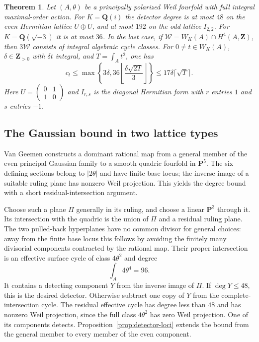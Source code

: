 \documentclass[11pt]{article}
\newtheorem{theorem}{Theorem}[section]
\theoremstyle{definition}
\theoremstyle{remark}
\newcommand{\Q}{\mathbf Q}
\newcommand{\Z}{\mathbf Z}
\begin{document}
\begin{theorem}\label{thm:small-detectors}
Let $(A,\theta)$ be a principally polarized Weil fourfold with full integral maximal-order action. For $K=\Q(i)$ the detector degree is at most $48$ on the even Hermitian lattice $U\oplus U$, and at most $192$ on the odd lattice $I_{2,2}$. For $K=\Q(\sqrt{-3})$ it is at most $36$. In the last case, if $\mathcal W=W_K(A)\cap H^4(A,\Z)$, then $3\mathcal W$ consists of integral algebraic cycle classes. For $0\ne t\in W_K(A)$, $\delta\in\Z_{>0}$ with $\delta t$ integral, and $T=\int_A t^2$, one has
\begin{equation}\label{eq:eisenstein-cost}
 c_t\leq\max\left\{3\delta,
 36\left\lfloor\frac{\delta\sqrt{2T}}3\right\rfloor\right\}
 \leq17\delta\lceil\sqrt T\rceil.
\end{equation}
Here $U=\left(\begin{smallmatrix}0&1\\1&0\end{smallmatrix}\right)$ and $I_{r,s}$ is the diagonal Hermitian form with $r$ entries $1$ and $s$ entries $-1$.
\end{theorem}

\subsection{The Gaussian bound in two lattice types}

Van Geemen \cite[Proposition~3.6 and Theorem~3.7, pp.~623--625]{vG96} constructs a dominant rational map from a general member of the even principal Gaussian family to a smooth quadric fourfold in $\mathbf P^5$. The six defining sections belong to $|2\theta|$ and have finite base locus; the inverse image of a suitable ruling plane has nonzero Weil projection. This yields the degree bound with a short residual-intersection argument.

Choose such a plane $\Pi$ generally in its ruling, and choose a linear $\mathbf P^3$ through it. Its intersection with the quadric is the union of $\Pi$ and a residual ruling plane. The two pulled-back hyperplanes have no common divisor for general choices: away from the finite base locus this follows by avoiding the finitely many divisorial components contracted by the rational map. Their proper intersection is an effective surface cycle of class $4\theta^2$ and degree
\[
 \int_A4\theta^4=96.
\]
It contains a detecting component $Y$ from the inverse image of $\Pi$. If $\deg Y\leq48$, this is the desired detector. Otherwise subtract one copy of $Y$ from the complete-intersection cycle. The residual effective cycle has degree less than $48$ and has nonzero Weil projection, since the full class $4\theta^2$ has zero Weil projection. One of its components detects. Proposition~\ref{prop:detector-loci} extends the bound from the general member to every member of the even component.
\end{document}
